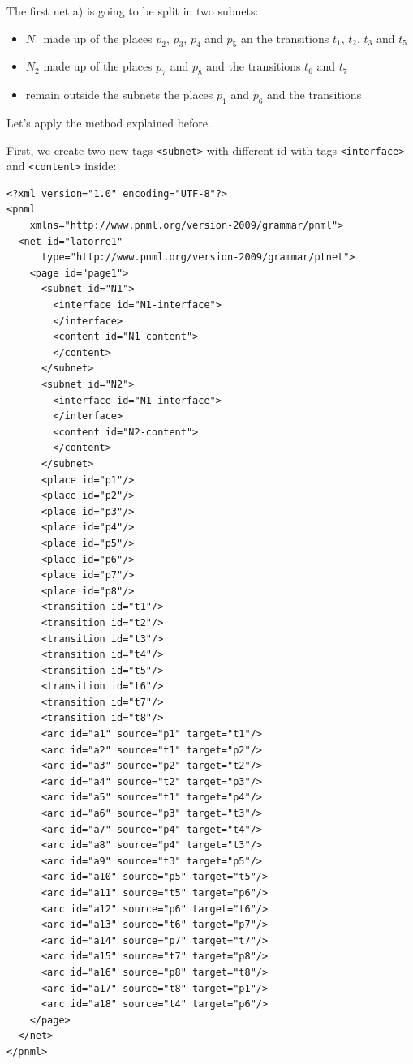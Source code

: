 The first net a) is going to be split in two subnets:
\begin{itemize}
\item $N_1$ made up of the places $p_2$, $p_3$, $p_4$ and $p_5$ an the transitions
$t_1$, $t_2$, $t_3$ and $t_5$
\item $N_2$ made up of the places $p_7$ and $p_8$ and the transitions $t_6$
and $t_7$
\item remain outside the subnets the places $p_1$ and $p_6$ and the transitions
\end{itemize}

Let's apply the method explained before.

First, we create two new tags \texttt{<subnet>} with different id with tags
\texttt{<interface>} and  \texttt{<content>} inside:

\begin{lstlisting}
<?xml version="1.0" encoding="UTF-8"?>
<pnml
    xmlns="http://www.pnml.org/version-2009/grammar/pnml">
  <net id="latorre1"
      type="http://www.pnml.org/version-2009/grammar/ptnet">
    <page id="page1">
      <subnet id="N1">
        <interface id="N1-interface">
        </interface>
        <content id="N1-content">
        </content>
      </subnet>
      <subnet id="N2">
        <interface id="N1-interface">
        </interface>
        <content id="N2-content">
        </content>
      </subnet>
      <place id="p1"/>
      <place id="p2"/>
      <place id="p3"/>
      <place id="p4"/>
      <place id="p5"/>
      <place id="p6"/>
      <place id="p7"/>
      <place id="p8"/>
      <transition id="t1"/>
      <transition id="t2"/>
      <transition id="t3"/>
      <transition id="t4"/>
      <transition id="t5"/>
      <transition id="t6"/>
      <transition id="t7"/>
      <transition id="t8"/>
      <arc id="a1" source="p1" target="t1"/>
      <arc id="a2" source="t1" target="p2"/>
      <arc id="a3" source="p2" target="t2"/>
      <arc id="a4" source="t2" target="p3"/>
      <arc id="a5" source="t1" target="p4"/>
      <arc id="a6" source="p3" target="t3"/>
      <arc id="a7" source="p4" target="t4"/>
      <arc id="a8" source="p4" target="t3"/>
      <arc id="a9" source="t3" target="p5"/>
      <arc id="a10" source="p5" target="t5"/>
      <arc id="a11" source="t5" target="p6"/>
      <arc id="a12" source="p6" target="t6"/>
      <arc id="a13" source="t6" target="p7"/>
      <arc id="a14" source="p7" target="t7"/>
      <arc id="a15" source="t7" target="p8"/>
      <arc id="a16" source="p8" target="t8"/>
      <arc id="a17" source="t8" target="p1"/>
      <arc id="a18" source="t4" target="p6"/>
    </page>
  </net>
</pnml>
\end{lstlisting}


